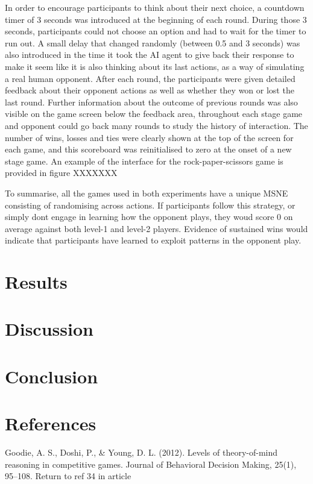 \documentclass[12pt]{article}         %
\begin{document}
In order to encourage participants to think about their next choice, a countdown timer of 3 seconds was introduced at the beginning of each round. During those 3 seconds, participants could not choose an option and had to wait for the timer to run out. A small delay that changed randomly (between 0.5 and 3 seconds) was also introduced in the time it took the AI agent to give back their response to make it seem like it is also thinking about its last actions, as a way of simulating a real human opponent. After each round, the participants were given detailed feedback about their opponent actions as well as whether they won or lost the last round. Further information about the outcome of previous rounds was also visible on the game screen below the feedback area, throughout each stage game and opponent could go back many rounds to study the history of interaction. The number of wins, losses and ties were clearly shown at the top of the screen for each game, and this scoreboard was reinitialised to zero at the onset of a new stage game. An example of the interface for the rock-paper-scissors game is provided in figure XXXXXXX 

To summarise, all the games used in both experiments have a unique MSNE consisting of randomising across actions. If participants follow this strategy, or simply dont engage in learning how the opponent plays, they woud score 0 on average against both level-1 and level-2 players. Evidence of sustained wins would indicate that participants have learned to exploit patterns in the opponent play. 



\section*{Results}



\section*{Discussion}



\section*{Conclusion}

  
\section{References}
Goodie, A. S., Doshi, P., & Young, D. L. (2012). Levels of theory-of-mind reasoning in competitive games. Journal of Behavioral Decision Making, 25(1), 95–108.
Return to ref 34 in article
\end{document}
